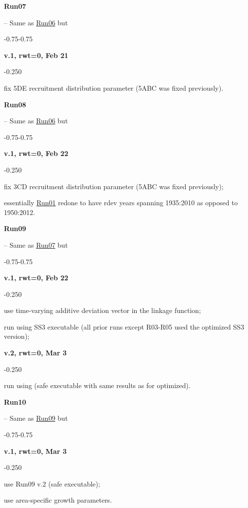 \hypertarget{R07}{\textbf{Run07}} -- Same as \hyperlink{R06}{Run06} but
\begin{itemize_csas}{-0.75}{-0.75}
	\item \textbf{v.1, rwt=0, Feb 21}
	\begin{itemize_csas}{-0.25}{0}
		\item fix 5DE recruitment distribution parameter (5ABC was fixed previously).
	\end{itemize_csas}
\end{itemize_csas}

\hypertarget{R08}{\textbf{Run08}} -- Same as \hyperlink{R06}{Run06} but
\begin{itemize_csas}{-0.75}{-0.75}
	\item \textbf{v.1, rwt=0, Feb 22}
	\begin{itemize_csas}{-0.25}{0}
		\item fix 3CD recruitment distribution parameter (5ABC was fixed previously);
		\item essentially \hyperlink{R01}{Run01} redone to have rdev years spanning 1935:2010 as opposed to 1950:2012.
	\end{itemize_csas}
\end{itemize_csas}

\hypertarget{R09}{\textbf{Run09}} -- Same as \hyperlink{R07}{Run07} but
\begin{itemize_csas}{-0.75}{-0.75}
	\item \textbf{v.1, rwt=0, Feb 22}
	\begin{itemize_csas}{-0.25}{0}
		\item use time-varying additive deviation vector in the linkage function;
		\item run using SS3 executable  (all prior runs except R03-R05 used the optimized SS3 version);
	\end{itemize_csas}
	\item \textbf{v.2, rwt=0, Mar 3}
	\begin{itemize_csas}{-0.25}{0}
		\item run using  (safe executable with same results as for optimized).
	\end{itemize_csas}
\end{itemize_csas}

\hypertarget{R10}{\textbf{Run10}} -- Same as \hyperlink{R09}{Run09} but
\begin{itemize_csas}{-0.75}{-0.75}
	\item \textbf{v.1, rwt=0, Mar 3}
	\begin{itemize_csas}{-0.25}{0}
		\item use Run09 v.2 (safe executable);
		\item use area-specific growth parameters.
	\end{itemize_csas}
\end{itemize_csas}

